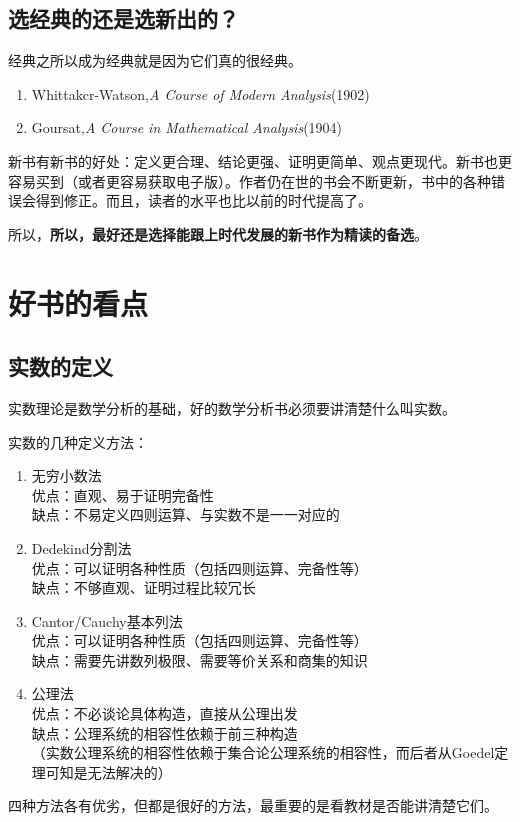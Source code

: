 \documentclass[UTF8]{article}
\begin{document}
    \subsection{选经典的还是选新出的？}
    经典之所以成为经典就是因为它们真的很经典。
    \begin{enumerate}
        \item Whittakcr-Watson,\emph{A Course of Modern Analysis}(1902)
        \item Goursat,\emph{A Course in Mathematical Analysis}(1904)
    \end{enumerate}

    新书有新书的好处：定义更合理、结论更强、证明更简单、观点更现代。新书也更容易买到（或者更容易获取电子版）。作者仍在世的书会不断更新，书中的各种错误会得到修正。而且，读者的水平也比以前的时代提高了。

    所以，\textbf{所以，最好还是选择能跟上时代发展的新书作为精读的备选}。
    \section{好书的看点}
    \subsection{实数的定义}
    实数理论是数学分析的基础，好的数学分析书必须要讲清楚什么叫实数。

    实数的几种定义方法：\begin{enumerate}
        \item 无穷小数法\\ 优点：直观、易于证明完备性\\ 缺点：不易定义四则运算、与实数不是一一对应的
        \item Dedekind分割法\\ 优点：可以证明各种性质（包括四则运算、完备性等）\\ 缺点：不够直观、证明过程比较冗长
        \item Cantor/Cauchy基本列法\\ 优点：可以证明各种性质（包括四则运算、完备性等）\\ 缺点：需要先讲数列极限、需要等价关系和商集的知识
        \item 公理法\\ 优点：不必谈论具体构造，直接从公理出发\\ 缺点：公理系统的相容性依赖于前三种构造\\ （实数公理系统的相容性依赖于集合论公理系统的相容性，而后者从Goedel定理可知是无法解决的）
    \end{enumerate}
    四种方法各有优劣，但都是很好的方法，最重要的是看教材是否能讲清楚它们。
\end{document}
